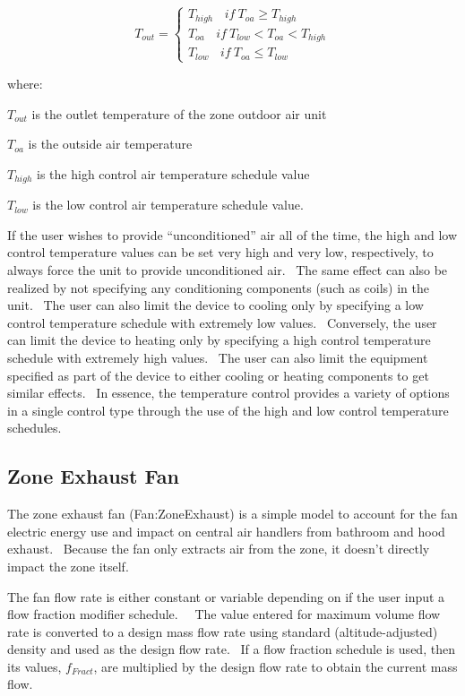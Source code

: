 \begin{equation}
{T_{out}} = \left\{ {\begin{array}{*{20}{c}}{{T_{high}}~~~~if~{T_{oa}} \ge {T_{high}}}\\ {{T_{oa}}~~~~if~{T_{low}} < {T_{oa}} < {T_{high}}}\\ {{T_{low}}~~~~if~{T_{oa}} \le {T_{low}}}\end{array}} \right.
\end{equation}

where:

\(T_{out}\) is the outlet temperature of the zone outdoor air unit

\(T_{oa}\) is the outside air temperature

\(T_{high}\) is the high control air temperature schedule value

\(T_{low}\) is the low control air temperature schedule value.

If the user wishes to provide ``unconditioned'' air all of the time, the high and low control temperature values can be set very high and very low, respectively, to always force the unit to provide unconditioned air.~ The same effect can also be realized by not specifying any conditioning components (such as coils) in the unit.~ The user can also limit the device to cooling only by specifying a low control temperature schedule with extremely low values.~ Conversely, the user can limit the device to heating only by specifying a high control temperature schedule with extremely high values.~ The user can also limit the equipment specified as part of the device to either cooling or heating components to get similar effects.~ In essence, the temperature control provides a variety of options in a single control type through the use of the high and low control temperature schedules.

\subsection{Zone Exhaust Fan}\label{zone-exhaust-fan}

The zone exhaust fan (Fan:ZoneExhaust) is a simple model to account for the fan electric energy use and impact on central air handlers from bathroom and hood exhaust.~ Because the fan only extracts air from the zone, it doesn't directly impact the zone itself.

The fan flow rate is either constant or variable depending on if the user input a flow fraction modifier schedule.~~ The value entered for maximum volume flow rate is converted to a design mass flow rate using standard (altitude-adjusted) density and used as the design flow rate.~ If a flow fraction schedule is used, then its values, \({f_{Fract}}\), are multiplied by the design flow rate to obtain the current mass flow.

